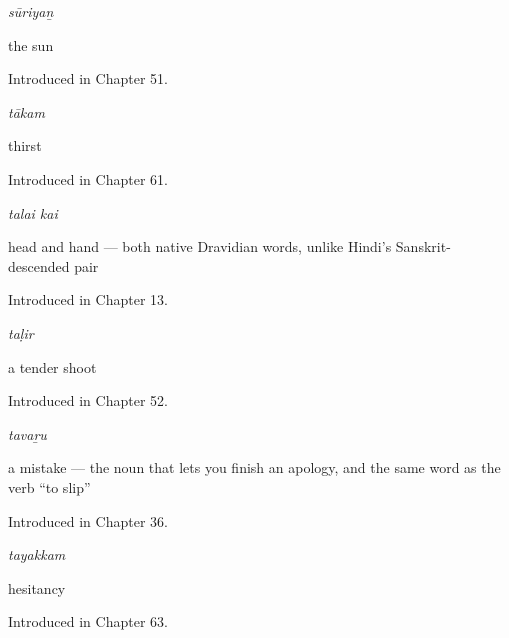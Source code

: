\noindent\begin{minipage}[t]{\linewidth}
\raggedright
\textbf{}\enspace\emph{sūriyaṉ}\par
\small the sun\par
\footnotesize Introduced in Chapter 51.
\end{minipage}\par\medskip

\noindent\begin{minipage}[t]{\linewidth}
\raggedright
\textbf{}\enspace\emph{tākam}\par
\small thirst\par
\footnotesize Introduced in Chapter 61.
\end{minipage}\par\medskip

\noindent\begin{minipage}[t]{\linewidth}
\raggedright
\textbf{ }\enspace\emph{talai kai}\par
\small head and hand — both native Dravidian words, unlike Hindi's Sanskrit-descended pair\par
\footnotesize Introduced in Chapter 13.
\end{minipage}\par\medskip

\noindent\begin{minipage}[t]{\linewidth}
\raggedright
\textbf{}\enspace\emph{taḷir}\par
\small a tender shoot\par
\footnotesize Introduced in Chapter 52.
\end{minipage}\par\medskip

\noindent\begin{minipage}[t]{\linewidth}
\raggedright
\textbf{}\enspace\emph{tavaṟu}\par
\small a mistake — the noun that lets you finish an apology, and the same word as the verb \textquotedblleft{}to slip\textquotedblright{}\par
\footnotesize Introduced in Chapter 36.
\end{minipage}\par\medskip

\noindent\begin{minipage}[t]{\linewidth}
\raggedright
\textbf{}\enspace\emph{tayakkam}\par
\small hesitancy\par
\footnotesize Introduced in Chapter 63.
\end{minipage}\par\medskip

